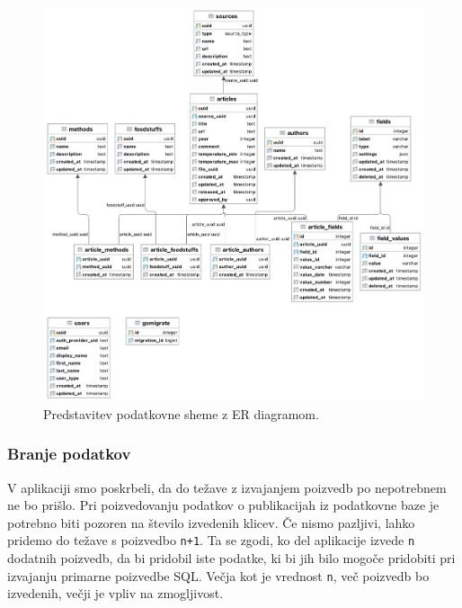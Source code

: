 \begin{figure}[ht]
\begin{center}
\includegraphics[width=1\textwidth]{slike/database-structure.png}
\end{center}
\caption{ Predstavitev podatkovne sheme z ER diagramom. }
\label{database-diagram-er}
\end{figure}

\subsubsection{Branje podatkov}
V aplikaciji smo poskrbeli, da do težave z izvajanjem poizvedb po nepotrebnem ne bo prišlo. Pri poizvedovanju podatkov o publikacijah iz podatkovne baze je potrebno biti pozoren na število izvedenih klicev. Če nismo pazljivi, lahko pridemo do težave s poizvedbo \verb=n+1=. Ta se zgodi, ko del aplikacije izvede \verb=n= dodatnih poizvedb, da bi pridobil iste podatke, ki bi jih bilo mogoče pridobiti pri izvajanju primarne poizvedbe SQL. Večja kot je vrednost \verb=n=, več poizvedb bo izvedenih, večji je vpliv na zmogljivost.

\clearpage
